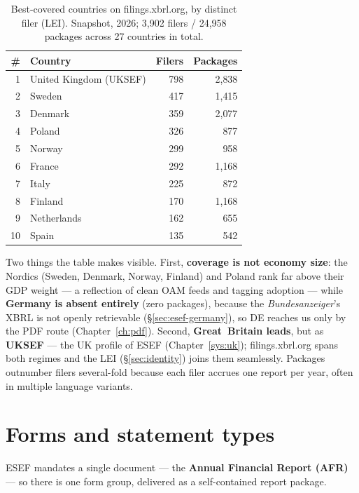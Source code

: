 \documentclass[11pt,a4paper]{report}
\begin{document}
\begin{table}[h]
\centering
\small
\caption{Best-covered countries on filings.xbrl.org, by distinct filer (LEI). Snapshot, 2026; 3{,}902 filers /
24{,}958 packages across 27 countries in total.}
\label{tab:esef-coverage}
\begin{tabular}{@{}rlrr@{}}
\toprule
\textbf{\#} & \textbf{Country} & \textbf{Filers} & \textbf{Packages} \\
\midrule
1  & United Kingdom (UKSEF) & 798 & 2{,}838 \\
2  & Sweden                 & 417 & 1{,}415 \\
3  & Denmark                & 359 & 2{,}077 \\
4  & Poland                 & 326 &   877 \\
5  & Norway                 & 299 &   958 \\
6  & France                 & 292 & 1{,}168 \\
7  & Italy                  & 225 &   872 \\
8  & Finland                & 170 & 1{,}168 \\
9  & Netherlands            & 162 &   655 \\
10 & Spain                  & 135 &   542 \\
\bottomrule
\end{tabular}
\end{table}

\noindent Two things the table makes visible. First, \textbf{coverage is not economy size}: the Nordics
(Sweden, Denmark, Norway, Finland) and Poland rank far above their GDP weight --- a reflection of clean OAM
feeds and tagging adoption --- while \textbf{Germany is absent entirely} (zero packages), because the
\emph{Bundesanzeiger}'s XBRL is not openly retrievable (\S\ref{sec:esef-germany}), so DE reaches us only by
the PDF route (Chapter~\ref{ch:pdf}). Second, \textbf{Great~Britain leads}, but as \textbf{UKSEF} --- the UK
profile of ESEF (Chapter~\ref{sys:uk}); filings.xbrl.org spans both regimes and the LEI (\S\ref{sec:identity})
joins them seamlessly. Packages outnumber filers several-fold because each filer accrues one report per year,
often in multiple language variants.

\section{Forms and statement types}\label{sec:esef-forms}

ESEF mandates a single document --- the \textbf{Annual Financial Report (AFR)} --- so there is one form
group, delivered as a self-contained report package.
\end{document}
